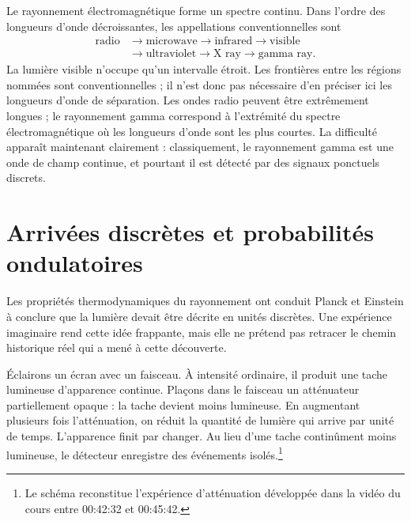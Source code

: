 Le rayonnement électromagnétique forme un spectre continu. Dans l’ordre des longueurs d’onde décroissantes, les appellations conventionnelles sont
\begin{equation}
\begin{aligned}
\text{radio}
&\longrightarrow \text{microwave}
\longrightarrow \text{infrared}
\longrightarrow \text{visible}\\
&\longrightarrow \text{ultraviolet}
\longrightarrow \text{X ray}
\longrightarrow \text{gamma ray}.
\end{aligned}
\end{equation}
La lumière visible n’occupe qu’un intervalle étroit. Les frontières entre les régions nommées sont conventionnelles ; il n’est donc pas nécessaire d’en préciser ici les longueurs d’onde de séparation. Les ondes radio peuvent être extrêmement longues ; le rayonnement gamma correspond à l’extrémité du spectre électromagnétique où les longueurs d’onde sont les plus courtes. La difficulté apparaît maintenant clairement : classiquement, le rayonnement gamma est une onde de champ continue, et pourtant il est détecté par des signaux ponctuels discrets.

\section{Arrivées discrètes et probabilités ondulatoires}

Les propriétés thermodynamiques du rayonnement ont conduit Planck et Einstein à conclure que la lumière devait être décrite en unités discrètes. Une expérience imaginaire rend cette idée frappante, mais elle ne prétend pas retracer le chemin historique réel qui a mené à cette découverte.

Éclairons un écran avec un faisceau. À intensité ordinaire, il produit une tache lumineuse d’apparence continue. Plaçons dans le faisceau un atténuateur partiellement opaque : la tache devient moins lumineuse. En augmentant plusieurs fois l’atténuation, on réduit la quantité de lumière qui arrive par unité de temps. L’apparence finit par changer. Au lieu d’une tache continûment moins lumineuse, le détecteur enregistre des événements isolés.\footnote{Le schéma reconstitue l’expérience d’atténuation développée dans la vidéo du cours entre 00:42:32 et 00:45:42.}


